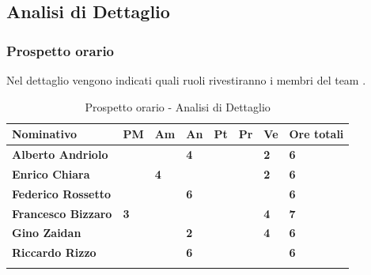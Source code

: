 \subsection{Analisi di Dettaglio}
\subsubsection{Prospetto orario}
Nel dettaglio vengono indicati quali ruoli rivestiranno i membri del team 
\GRUPPO.
\begin{center}
	\def\arraystretch{1.6}
	\bgroup
	\begin{longtable}{| p{4cm} | p{1cm} | p{1cm} | p{1cm} | p{1cm}| p{1cm} | 
			p{1cm} | p{1.7cm}|}
		\hline
		\textbf{Nominativo} & \textbf{PM} & \textbf{Am} & \textbf{An} & 
		\textbf{Pt} & \textbf{Pr} & \textbf{Ve} & \textbf{Ore totali}\\ 
		
		\hline \hline  
		
		\textbf{Alberto Andriolo} & \textbf{} & \textbf{} & \textbf{4} & 
		\textbf{} & \textbf{} & \textbf{2} & \textbf{6}\\ 
		\hline 
		
		\textbf{Enrico Chiara} & \textbf{} & \textbf{4} & \textbf{} & 
		\textbf{} & \textbf{} & \textbf{2} & \textbf{6}\\ 
		\hline 
		
		\textbf{Federico Rossetto} & \textbf{} & \textbf{} & \textbf{6} & 
		\textbf{} & \textbf{} & \textbf{} & \textbf{6}\\ 
		\hline 
		
		\textbf{Francesco Bizzaro} & \textbf{3} & \textbf{} & \textbf{} & 
		\textbf{} & \textbf{} & \textbf{4} & \textbf{7}\\ 
		\hline 
		
		\textbf{Gino Zaidan} & \textbf{} & \textbf{} & \textbf{2} & 
		\textbf{} & \textbf{} & \textbf{4} & \textbf{6}\\ 
		\hline 
		
		\textbf{Riccardo Rizzo} & \textbf{} & \textbf{} & \textbf{6} & 
		\textbf{} & \textbf{} & \textbf{} & \textbf{6}\\ 
		\hline 
		
		\hline 
		
		\caption{Prospetto orario - Analisi di Dettaglio}
	\end{longtable}
	\egroup
\end{center}
